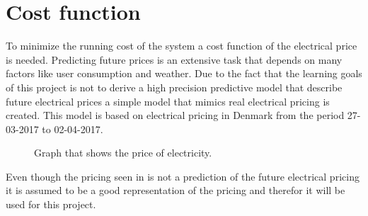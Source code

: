 \section{Cost function}

To minimize the running cost of the system a cost function of the electrical price is needed. Predicting future prices is an extensive task that depends on many factors like user consumption and weather. Due to the fact that the learning goals of this project is not to derive a high precision predictive model that describe future electrical prices a simple model that mimics real electrical pricing is created. This model is based on electrical pricing in Denmark from the period 27-03-2017 to 02-04-2017.  



	


\begin{figure}[H]
\centering

\caption{Graph that shows the price of electricity.}
\label{fig:electrical_price} 
\end{figure}

Even though the pricing seen in  is not a prediction of the future electrical pricing it is assumed to be a good representation of the pricing and therefor it will be used for this project. 

